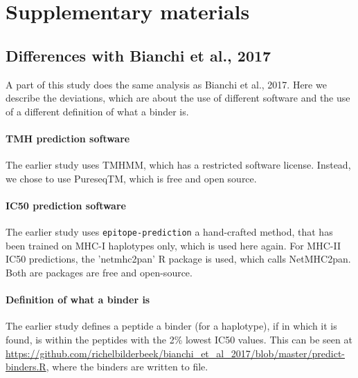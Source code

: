 \appendix
\section{Supplementary materials}

\subsection{Differences with Bianchi et al., 2017}

A part of this study does the same analysis as Bianchi et al., 2017.
Here we describe the deviations, which are about the use of different
software and the use of a different definition of what a binder is.

\paragraph{TMH prediction software}

The earlier study uses TMHMM, which has a restricted software license.
Instead, we chose to use PureseqTM, which is free and open source.



\paragraph{IC50 prediction software}

The earlier study uses \verb;epitope-prediction; a hand-crafted method, 
that has been trained on MHC-I haplotypes only,
which is used here again. For MHC-II IC50 predictions, the
'netmhc2pan' R package is used, which calls NetMHC2pan.
Both are packages are free and open-source.

\paragraph{Definition of what a binder is}

The earlier study defines a peptide a binder (for a haplotype), 
if  in which it is found, 
is within the peptides with the 2\% lowest IC50 values.
This can be seen at \url{https://github.com/richelbilderbeek/bianchi_et_al_2017/blob/master/predict-binders.R},
where the binders are written to file.

